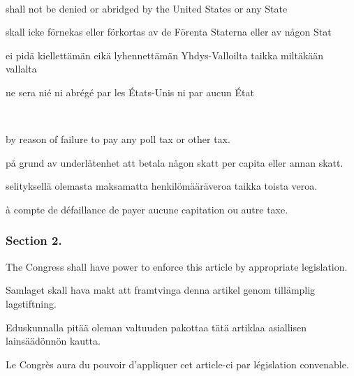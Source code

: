\documentclass[a4paper,landscape,12pt]{article}
\begin{document}
~

\begin{minipage}[t]{0.22\textwidth}
shall not be denied or abridged by the United States or any State 
\end{minipage}\textwidth
\begin{minipage}[t]{0.22\textwidth}
skall icke förnekas eller förkortas av de Förenta Staterna eller av någon Stat
\end{minipage}\textwidth
\begin{minipage}[t]{0.22\textwidth}
	 ei pidä kiellettämän eikä lyhennettämän Yhdys-Valloilta taikka miltäkään vallalta
\end{minipage}\textwidth
\begin{minipage}[t]{0.22\textwidth}
	ne sera nié ni abrégé par les États-Unis ni par aucun État
\end{minipage}

~

\begin{minipage}[t]{0.22\textwidth}
	by reason of failure to pay any poll tax or other tax.
\end{minipage}\textwidth
\begin{minipage}[t]{0.22\textwidth}
	 på grund av underlåtenhet att betala någon skatt per capita eller annan skatt.
\end{minipage}\textwidth
\begin{minipage}[t]{0.22\textwidth}
	 selityksellä olemasta maksamatta henkilömääräveroa taikka toista veroa.
\end{minipage}\textwidth
\begin{minipage}[t]{0.22\textwidth}
	à compte de défaillance de payer aucune capitation ou autre taxe.
	\end{minipage}

\subsubsection*{Section 2.}
\begin{minipage}[t]{0.22\textwidth}
	The Congress shall have power to enforce this article by appropriate legislation.
\end{minipage}\textwidth
\begin{minipage}[t]{0.22\textwidth}
	Samlaget skall hava makt att framtvinga denna artikel genom tillämplig lagstiftning.
\end{minipage}\textwidth
\begin{minipage}[t]{0.22\textwidth}
	Eduskunnalla pitää oleman valtuuden pakottaa tätä artiklaa asiallisen lainsäädönnön kautta.
\end{minipage}\textwidth
\begin{minipage}[t]{0.22\textwidth}
Le Congrès aura du pouvoir d'appliquer cet article-ci par législation convenable.
\end{minipage}
\end{document}
